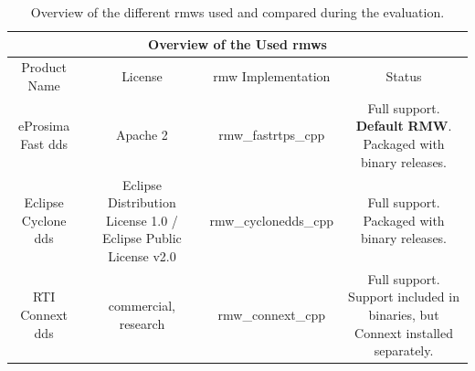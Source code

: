 \begin{table}[htbp]
    \centering
\begin{tabular}{ |c|c|c|c| }
\hline
\multicolumn{4}{|c|}{Overview of the Used \glspl{rmw}} \\
\hline
Product Name & License & \gls{rmw} Implementation & Status  \\
\hline
\hline
eProsima Fast \gls{dds} & Apache 2 & rmw\_fastrtps\_cpp & 
    \begin{minipage}{4.2cm}
	    \vspace{8pt}
		  Full support. \textbf{Default} \textbf{RMW}. Packaged with binary releases.
	    \vspace{8pt}
	\end{minipage} \\\hline
 Eclipse Cyclone \gls{dds} & \begin{minipage}{2cm} \vspace{8pt} Eclipse Distribution License 1.0 / Eclipse Public License v2.0 \vspace{8pt}\end{minipage} & rmw\_cyclone\gls{dds}\_cpp & 
    \begin{minipage}{4.2cm}
	   \vspace{34pt}
      Full support. Packaged with binary releases.\newline\newline
	   \vspace{8pt}
	\end{minipage} \\\hline
 RTI Connext \gls{dds} & \begin{minipage}{2cm} \vspace{8pt} commercial, research \vspace{8pt}\end{minipage} & rmw\_connext\_cpp & 
    \begin{minipage}{4.2cm}
	   \vspace{8pt}
		 Full support. Support included in binaries, but Connext installed separately.
	   \vspace{8pt}
	\end{minipage} \\\hline%
\end{tabular}
    \caption{Overview of the different \glspl{rmw} used and compared during the evaluation.}\label{c3_tab_overview_rmw} %
\end{table}


